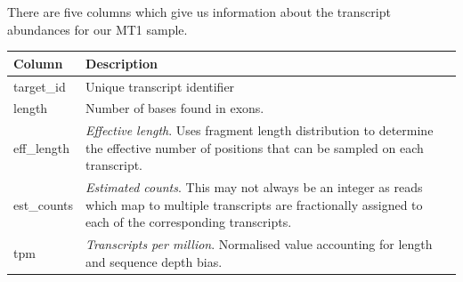 \documentclass[11pt]{article}
\begin{document}
    There are five columns which give us information about the transcript
abundances for our MT1 sample.

\begin{longtable}[]{@{}ll@{}}
\toprule
\begin{minipage}[b]{0.47\columnwidth}\raggedright
Column\strut
\end{minipage} & \begin{minipage}[b]{0.47\columnwidth}\raggedright
Description\strut
\end{minipage}\tabularnewline
\midrule
\endhead
\begin{minipage}[t]{0.47\columnwidth}\raggedright
target\_id\strut
\end{minipage} & \begin{minipage}[t]{0.47\columnwidth}\raggedright
Unique transcript identifier\strut
\end{minipage}\tabularnewline
\begin{minipage}[t]{0.47\columnwidth}\raggedright
length\strut
\end{minipage} & \begin{minipage}[t]{0.47\columnwidth}\raggedright
Number of bases found in exons.\strut
\end{minipage}\tabularnewline
\begin{minipage}[t]{0.47\columnwidth}\raggedright
eff\_length\strut
\end{minipage} & \begin{minipage}[t]{0.47\columnwidth}\raggedright
\textit{Effective length}. Uses fragment length distribution to determine
the effective number of positions that can be sampled on each
transcript.\strut
\end{minipage}\tabularnewline
\begin{minipage}[t]{0.47\columnwidth}\raggedright
est\_counts\strut
\end{minipage} & \begin{minipage}[t]{0.47\columnwidth}\raggedright
\textit{Estimated counts}. This may not always be an integer as reads
which map to multiple transcripts are fractionally assigned to each of
the corresponding transcripts.\strut
\end{minipage}\tabularnewline
\begin{minipage}[t]{0.47\columnwidth}\raggedright
tpm\strut
\end{minipage} & \begin{minipage}[t]{0.47\columnwidth}\raggedright
\textit{Transcripts per million}. Normalised value accounting for length
and sequence depth bias.\strut
\end{minipage}\tabularnewline
\bottomrule
\end{longtable}
\end{document}
